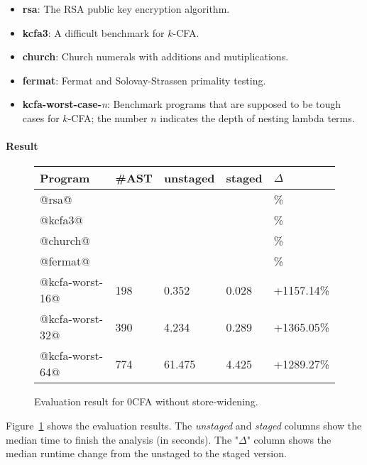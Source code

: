 \begin{itemize}
  \item \textbf{rsa}: The RSA public key encryption algorithm.
  \item \textbf{kcfa3}: A difficult benchmark for $k$-CFA.
  \item \textbf{church}: Church numerals with additions and mutiplications.
  \item \textbf{fermat}: Fermat and Solovay-Strassen primality testing.
  \item \textbf{kcfa-worst-case-}\textit{n}: 
    Benchmark programs that are supposed to be tough cases for $k$-CFA; 
    the number $n$ indicates the depth of nesting lambda terms.
\end{itemize}

\paragraph{Result}

\begin{figure}[h]
\tiny
\begin{tabular}{@{}lllll@{}}
\toprule
    Program          &\#AST & unstaged   & staged     & $\Delta$ \\ \midrule
    @rsa@            &      &            &            & \%          \\
    @kcfa3@          &      &            &            & \%          \\
    @church@         &      &            &            & \%          \\
    @fermat@         &      &            &            & \%          \\
    @kcfa-worst-16@  &  198 & 0.352      & 0.028      & +1157.14\%        \\
    @kcfa-worst-32@  &  390 & 4.234      & 0.289      & +1365.05\%          \\
    @kcfa-worst-64@  &  774 & 61.475     & 4.425      & +1289.27\%         \\
    \bottomrule
\end{tabular}
\caption{Evaluation result for 0CFA without store-widening.} \label{evaluation_result}
\end{figure}

Figure~\ref{evaluation_result} shows the evaluation results. The
\textit{unstaged} and \textit{staged} columns show the median time to finish the
analysis (in seconds). The "$\Delta$" column shows the median runtime change
from the unstaged to the staged version. 

\iffalse
As we can see from the table, the staged version significantly outperforms the
unstaged especially for the difficult ones. However, for some benchmarks, we
observe degraded performance. We conjecture this happens due to the fact that
the large size of the generated code is unoptimized -- as what we test here is a
simple implementation almost identical to what we described in the previous
sections, we believe the performance still can be improved if more engineering
effort is taken, such as optimizing code generation and avoiding code
duplication.
\fi